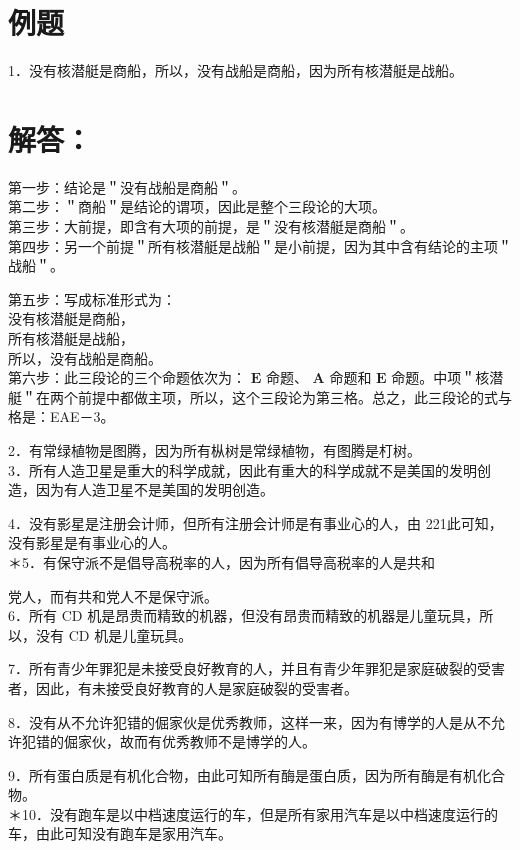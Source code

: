 \section*{例题}
1．没有核潜艇是商船，所以，没有战船是商船，因为所有核潜艇是战船。

\section*{解答：}
第一步：结论是＂没有战船是商船＂。\\
第二步：＂商船＂是结论的谓项，因此是整个三段论的大项。\\
第三步：大前提，即含有大项的前提，是＂没有核潜艇是商船＂。\\
第四步：另一个前提＂所有核潜艇是战船＂是小前提，因为其中含有结论的主项＂战船＂。

第五步：写成标准形式为：\\
没有核潜艇是商船，\\
所有核潜艇是战船，\\
所以，没有战船是商船。\\
第六步：此三段论的三个命题依次为： $\mathbf{E}$ 命题、 $\mathbf{A}$ 命题和 $\mathbf{E}$ 命题。中项＂核潜艇＂在两个前提中都做主项，所以，这个三段论为第三格。总之，此三段论的式与格是：EAE－3。

2．有常绿植物是图腾，因为所有枞树是常绿植物，有图腾是朾树。\\
3．所有人造卫星是重大的科学成就，因此有重大的科学成就不是美国的发明创造，因为有人造卫星不是美国的发明创造。

4．没有影星是注册会计师，但所有注册会计师是有事业心的人，由 221此可知，没有影星是有事业心的人。\\
＊5．有保守派不是倡导高税率的人，因为所有倡导高税率的人是共和

党人，而有共和党人不是保守派。\\
6．所有 CD 机是昂贵而精致的机器，但没有昂贵而精致的机器是儿童玩具，所以，没有 CD 机是儿童玩具。

7．所有青少年罪犯是未接受良好教育的人，并且有青少年罪犯是家庭破裂的受害者，因此，有未接受良好教育的人是家庭破裂的受害者。

8．没有从不允许犯错的倔家伙是优秀教师，这样一来，因为有博学的人是从不允许犯错的倔家伙，故而有优秀教师不是博学的人。

9．所有蛋白质是有机化合物，由此可知所有酶是蛋白质，因为所有酶是有机化合物。\\
＊10．没有跑车是以中档速度运行的车，但是所有家用汽车是以中档速度运行的车，由此可知没有跑车是家用汽车。

